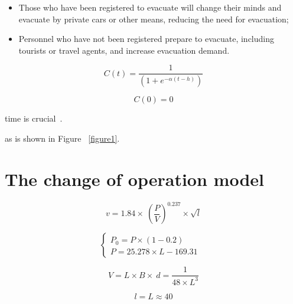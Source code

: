 \documentclass{mcmthesis}
\begin{document}
\begin{itemize}

\item Those who have been registered to evacuate will change their minds and evacuate by private cars or other means, reducing the need for evacuation;
\item Personnel who have not been registered prepare to evacuate, including tourists or travel agents, and increase evacuation demand.

\end{itemize}





\begin{equation}\label{1}
C(t) = \frac{1}{{(1 + {e^{ - \alpha (t - h)}})}}
\end{equation}

\begin{equation}\label{2}
C(0) = 0
\end{equation}



time is crucial~\cite{Sayyady2010Optimizing,So2010Managing}.



as is shown in Figure ~\ref{figure1}.



\section{The change of operation model}

\begin{equation}\label{1}
v=1.84\times \ (\frac{P}{V}) ^{0.237} \times \sqrt{l}
\end{equation}

\begin{equation}
\left\{
\begin{array}{lr}
P_0=P \times (1-0.2) &\\
P=25.278\times L -169.31
\end{array}
\right.
\end{equation}



\begin{equation}\label{3}
V=L\times B\times\ d =\frac{1}{48\times L^3}
\end{equation}

\begin{equation}\label{4}
l=L\approx 40
\end{equation}
\end{document}
